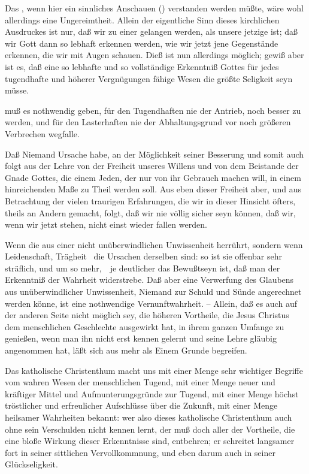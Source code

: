 \begin{aufza}
Das , wenn hier ein sinnliches Anschauen () verstanden werden müßte, wäre wohl allerdings eine Ungereimtheit. Allein der eigentliche Sinn dieses kirchlichen Ausdruckes ist nur, daß wir zu einer  gelangen werden, als unsere jetzige ist; daß wir Gott dann so lebhaft erkennen werden, wie wir jetzt jene Gegenstände erkennen, die wir mit Augen schauen. Dieß ist nun allerdings möglich; gewiß aber ist es, daß eine so lebhafte und so vollständige Erkenntniß Gottes für jedes tugendhafte und höherer Vergnügungen fähige Wesen die größte Seligkeit seyn müsse.
\item {} muß es nothwendig geben,  für den Tugendhaften nie der Antrieb, noch besser zu werden, und für den Lasterhaften nie der Abhaltungsgrund vor noch größeren Verbrechen wegfalle.
\item Daß Niemand Ursache habe, an der Möglichkeit seiner Besserung und somit auch  folgt aus der Lehre von der Freiheit unseres Willens und von dem Beistande der Gnade Gottes, die einem Jeden, der nur von ihr Gebrauch machen will, in einem hinreichenden Maße zu Theil werden soll. Aus eben dieser Freiheit aber, und aus Betrachtung der vielen traurigen Erfahrungen, die wir in dieser Hinsicht öfters, theils an Andern gemacht, folgt, daß wir nie völlig sicher seyn können, daß wir, wenn wir jetzt stehen, nicht einst wieder fallen werden.
\item Wenn die  aus einer nicht unüberwindlichen Unwissenheit herrührt, sondern wenn Leidenschaft, Trägheit \usw\ die Ursachen derselben sind: so ist sie offenbar sehr sträflich, und um so mehr,~\ je deutlicher das Bewußtseyn ist, daß man der Erkenntniß der Wahrheit widerstrebe. Daß aber eine Verwerfung des Glaubens aus unüberwindlicher Unwissenheit, Niemand zur Schuld und Sünde angerechnet werden könne, ist eine nothwendige Vernunftwahrheit. -- Allein, daß es auch auf der anderen Seite nicht möglich sey, die höheren Vortheile, die Jesus Christus dem menschlichen Geschlechte ausgewirkt hat, in ihrem ganzen Umfange zu genießen, wenn man ihn nicht erst kennen gelernt und seine Lehre gläubig angenommen hat, läßt sich aus mehr als Einem Grunde begreifen.
\begin{aufzc}
\item Das katholische Christenthum macht uns mit einer Menge sehr wichtiger Begriffe vom wahren Wesen der menschlichen Tugend, mit einer Menge neuer und kräftiger Mittel und Aufmunterungsgründe zur Tugend, mit einer Menge höchst tröstlicher und erfreulicher Aufschlüsse über die Zukunft, mit einer Menge heilsamer Wahrheiten bekannt: wer also dieses katholische Christenthum auch ohne sein Verschulden nicht kennen lernt, der muß doch aller der Vortheile, die eine bloße Wirkung dieser Erkenntnisse sind, entbehren; er schreitet langsamer fort in seiner sittlichen Vervollkommnung, und eben darum auch in seiner Glückseligkeit.

\end{aufzc}
\end{aufza}
